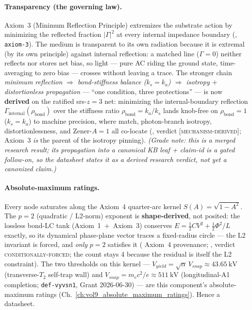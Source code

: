 \paragraph{Transparency (the governing law).} Axiom~3 (Minimum Reflection Principle) extremizes the substrate action by minimizing the reflected fraction $|\Gamma|^2$ at every internal impedance boundary (, \texttt{axiom-3}). The medium is transparent to its own radiation because it is extremal (by its own principle) against internal reflection: a matched line ($\Gamma=0$) neither reflects nor stores net bias, so light --- pure AC riding the ground state, time-averaging to zero bias --- crosses without leaving a trace. The stronger chain \emph{minimum reflection $\Rightarrow$ bond-stiffness balance ($k_s = k_a$) $\Rightarrow$ isotropy $+$ distortionless propagation} --- ``one condition, three protections'' --- is now \textbf{derived} on the ratified srs-$z=3$ net: minimizing the internal-boundary reflection $\Gamma_{\mathrm{internal}}(\rho_{\mathrm{bond}})$ over the stiffness ratio $\rho_{\mathrm{bond}} = k_a/k_s$ lands knob-free on $\rho_{\mathrm{bond}} = 1$ ($k_s = k_a$) to machine precision, where match, photon-branch isotropy, distortionlessness, and Zener-$A{=}1$ all co-locate (, verdict \textsc{[mechanism-derived]}; Axiom~3 \emph{is} the parent of the isotropy pinning). \emph{(Grade note: this is a merged research result; its propagation into a canonical KB leaf + claim-id is a gated follow-on, so the datasheet states it as a derived research verdict, not yet a canonized claim.)}

\paragraph{Absolute-maximum ratings.} Every node saturates along the Axiom~4 quarter-arc kernel $S(A) = \sqrt{1 - A^2}$. The $p=2$ (quadratic / L2-norm) exponent is \textbf{shape-derived}, not posited: the lossless bond-LC tank (Axiom~1~$+$~Axiom~3) conserves $E = \tfrac12 C V^2 + \tfrac12 \Phi^2/L$ exactly, so its dynamical phase-plane vector traces a fixed-radius circle --- the L2 invariant is forced, and \emph{only} $p=2$ satisfies it ( Axiom~4 provenance; , verdict \textsc{conditionally-forced}; the count stays 4 because the residual is itself the L2 constraint). The two thresholds on this kernel --- $V_{yield} = \sqrt{\alpha}\,V_{snap} \approx \qty{43.65}{\kV}$ (transverse-$T_2$ self-trap wall) and $V_{snap} = m_e c^2/e \approx \qty{511}{\kV}$ (longitudinal-A1 completion; \texttt{def-vyvsn1}, Grant 2026-06-30) --- are this component's absolute-maximum ratings (Ch.~\ref{ch:vol9_absolute_maximum_ratings}). Hence a datasheet.

